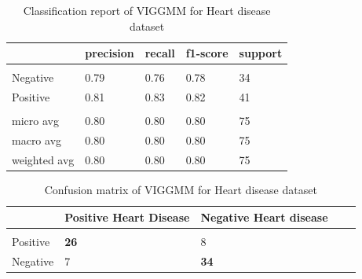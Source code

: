 \documentclass[letterpaper]{article}
\begin{document}
\begin{table}
    \caption{Classification report of VIGGMM for Heart disease dataset}
    \label{classification report  Heart disease}
    \centering
    \resizebox{\columnwidth}{!}
    {%
    \begin{tabular}{lllll}
        \multicolumn{1}{c}{\bf }  &\multicolumn{1}{c}{\bf precision}&\multicolumn{1}{c}{\bf recall}&\multicolumn{1}{c}{\bf f1-score} &\multicolumn{1}{c}{\bf support}   \\
        \hline \\
        Negative          &0.79 &0.76&0.78&34 \\
        Positive              &0.81  &0.83&0.82&41\\\\
        
        micro avg             &0.80  &0.80&0.80&75\\
        macro avg             &0.80  &0.80&0.80&75\\
        weighted avg             &0.80  &0.80&0.80&75\\
        \end{tabular}
    }
\end{table}
        \begin{table}
            \caption{Confusion matrix of VIGGMM for Heart disease dataset }
            \label{confusion heart disease}
            \centering
            \resizebox{\columnwidth}{!}
            {%
            \begin{tabular}{lllll}
                \multicolumn{1}{c}{\bf }  &\multicolumn{1}{c}{\bf Positive Heart Disease}&\multicolumn{1}{c}{\bf Negative Heart disease}   \\
                \hline \\
                Positive          &\textbf{26} &8\\
                Negative             &7  &\textbf{34}\\
                
                \end{tabular}
            }
        \end{table}
\end{document}
